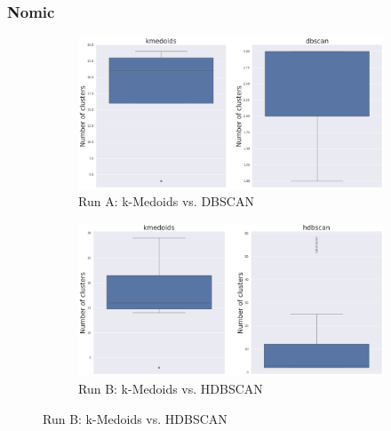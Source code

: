 \documentclass[10pt,oneside]{report}
\begin{document}
\subsubsection{Nomic}

\begin{figure}[H]
    \centering
    \begin{subfigure}[b]{\textwidth}
        \centering
        \includegraphics[width=\textwidth]{./images/nomic_kmedoidsvsdbscan_whisker.png}
        \caption{Run A: k-Medoids vs. DBSCAN}\label{fig:nomic_h2h_runa}
    \end{subfigure}
    \hfill
    \begin{subfigure}[b]{\textwidth}
        \centering
        \includegraphics[width=\textwidth]{./images/nomic_kmedoidsvshdbscan_whisker.png}
        \caption{Run B: k-Medoids vs. HDBSCAN}\label{fig:nomic_h2h_runb}
    \end{subfigure}
\end{figure}
\end{document}
